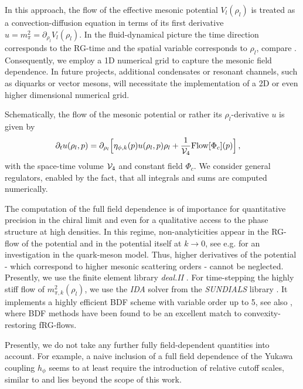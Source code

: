 \documentclass[aps,twocolumn,prd,superscriptaddress]{revtex4-2}
\begin{document}
In this approach, the flow of the effective mesonic potential $V_l(\rho_l)$ is treated as a convection-diffusion equation in terms of its first derivative $u= m_\pi^2 = \partial_{\rho_l} V_l(\rho_l)$. In the fluid-dynamical picture the time direction corresponds to the RG-time and the spatial variable corresponds to $\rho_l$, compare . Consequently, we employ a 1D numerical grid to capture the mesonic field dependence. In future projects, additional condensates or resonant channels, such as diquarks or vector mesons, will necessitate the implementation of a 2D or even higher dimensional numerical grid.

Schematically, the flow of the mesonic potential or rather its $\rho_l$-derivative $u$ is given by
%
\begin{align}\label{eq:easyQCDflow}
	\partial_{t}u(\rho_l, p)
	=
	\partial_{\rho_l} & \Big[\eta_{\phi,k}(p) u(\rho_l, p)\rho_l + \frac{1}{{\cal V}_4} \mathrm{Flow}[\Phi_c](p)\Big]\,, 
\end{align}
%
with the space-time volume ${\cal V}_4$ and constant field $\Phi_c$. We consider general regulators, enabled by the fact, that all integrals and sums are computed numerically. 

The computation of the full field dependence is of importance for quantitative precision in the chiral limit and even for a qualitative access to the phase structure at high densities. In this regime, non-analyticities appear in the RG-flow of the potential and in the potential itself at $k \to 0$, see e.g. \cite{Grossi:2021ksl} for an investigation in the quark-meson model. Thus, higher derivatives of the potential - which correspond to higher mesonic scattering orders - cannot be neglected.
Presently, we use the finite element library \textit{deal.II} \cite{dealII95}. For time-stepping the highly stiff flow of $m_{\pi,k}^2(\rho_l)$, we use the \textit{IDA} solver from the \textit{SUNDIALS} library \cite{gardner2022sundials,hindmarsh2005sundials}. It implements a highly efficient BDF scheme with variable order up to 5, see also \cite{Ihssen:2023qaq}, where BDF methods have been found to be an excellent match to convexity-restoring fRG-flows. 

Presently, we do not take any further fully field-dependent quantities into account.
For example, a naive inclusion of a full field dependence of the Yukawa coupling $h_\phi$ seems to at least require the introduction of relative cutoff scales, similar to \cite{Ihssen:2023xlp} and lies beyond the scope of this work.
\end{document}
